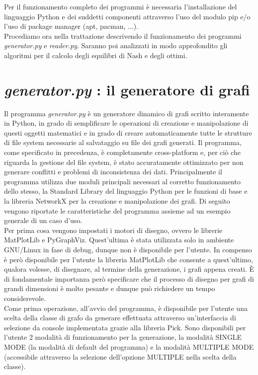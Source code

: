 Per il funzionamento completo dei programmi è necessaria l'installazione del linguaggio Python e dei suddetti componenti attraverso l'uso del modulo pip e/o l'uso di package manager (apt, pacman, ...).\\
Procediamo ora nella trattazione descrivendo il funzionamento dei programmi \textit{generator.py} e \textit{reader.py}. Saranno poi analizzati in modo approfondito gli algoritmi per il calcolo degli equilibri di Nash e degli ottimi.\\

\section{\textit{generator.py} : il generatore di grafi}
\justify
Il programma \textit{generator.py} è un generatore dinamico di grafi scritto interamente in Python, in grado di semplificare le operazioni di creazione e manipolazione di questi oggetti matematici e in grado di creare automaticamente tutte le strutture di file system necessarie al salvataggio su file dei grafi generati. Il programma, come specificato in precedenza, è completamente cross-platform e, per ciò che riguarda la gestione del file system, è stato accuratamente ottimizzato per non generare conflitti e problemi di inconsistenza dei dati. Principalmente il programma utilizza due moduli principali necessari al corretto funzionamento dello stesso, la Standard Library del linguaggio Python per le funzioni di base e la libreria NetworkX per la creazione e manipolazione dei grafi. Di seguito vengono riportate le caratteristiche del programma assieme ad un esempio generale di un caso d'uso.\\
Per prima cosa vengono impostati i motori di disegno, ovvero le librerie MatPlotLib e PyGraphViz. Quest'ultima è stata utilizzata solo in ambiente GNU/Linux in fase di debug, dunque non è disponibile per l'utente. In compenso è però disponibile per l'utente la libreria MatPlotLib che consente a quest'ultimo, qualora volesse, di disegnare, al termine della generazione, i grafi appena creati. È di fondamentale importanza però specificare che il processo di disegno per grafi di grandi dimensioni è molto pesante e dunque può richiedere un tempo considerevole.\\
Come prima operazione, all'avvio del programma, è disponibile per l'utente una scelta della classe di grafo da generare effettuata attraverso un'interfaccia di selezione da console implementata grazie alla libreria Pick. Sono disponibili per l'utente 2 modalità di funzionamento per la generazione, la modalità SINGLE MODE (la modalità di default del programma) e la modalità MULTIPLE MODE (accessibile attraverso la selezione dell'opzione MULTIPLE nella scelta della classe).\\

